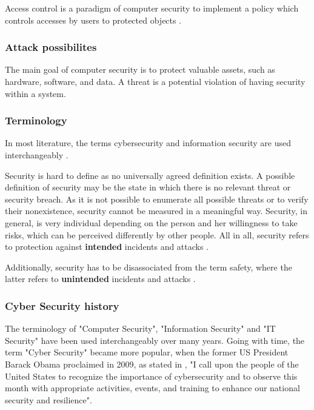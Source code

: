 Access control is a paradigm of computer security to implement a policy which controls accesses by users to protected objects \cite{Pfleeger2014}.


\subsubsection{Attack possibilites}
The main goal of computer security is to protect valuable assets, such as hardware, software, and data. A threat is a potential violation of having security within a system.


\subsubsection{Terminology}
In most literature, the terms cybersecurity and information security are used interchangeably \cite{VonSolms2013}.

Security is hard to define as no universally agreed definition exists. A possible definition of security may be the state in which there is no relevant threat or security breach. As it is not possible to enumerate all possible threats or to verify their nonexistence, security cannot be measured in a meaningful way. Security, in general, is very individual depending on the person and her willingness to take risks, which can be perceived differently by other people. All in all, security refers to protection against \textbf{intended} incidents and attacks \cite{Bishop2004, Pfleeger2014}.

Additionally, security has to be disassociated from the term safety, where the latter refers to \textbf{unintended} incidents and attacks \cite{Bishop2004}.


\subsubsection{Cyber Security history}
The terminology of "Computer Security", "Information Security" and "IT Security" have been used interchangeably over many years. Going with time, the term "Cyber Security" became more popular, when the former US President Barack Obama proclaimed in 2009, as stated in \cite{TheWhiteHouse2009}, "I call upon the people of the United States to recognize the importance of cybersecurity and to observe this month with appropriate activities, events, and training to enhance our national security and resilience".

